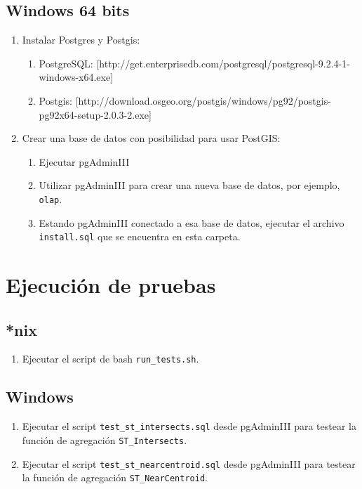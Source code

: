\documentclass[a4paper,12pt]{article}
\begin{document}
\subsection{Windows 64 bits}

\begin{enumerate}
\def\labelenumi{\arabic{enumi}.}
\item
  Instalar Postgres y Postgis:

  \begin{enumerate}
  \def\labelenumii{\arabic{enumii}.}
  \itemsep1pt\parskip0pt
  \item
    PostgreSQL:
    {[}http://get.enterprisedb.com/postgresql/postgresql-9.2.4-1-windows-x64.exe{]}
  \item
    Postgis:
    {[}http://download.osgeo.org/postgis/windows/pg92/postgis-pg92x64-setup-2.0.3-2.exe{]}
  \end{enumerate}
\item
  Crear una base de datos con posibilidad para usar PostGIS:

  \begin{enumerate}
  \def\labelenumii{\arabic{enumii}.}
  \itemsep1pt\parskip0pt
  \item
    Ejecutar pgAdminIII
  \item
    Utilizar pgAdminIII para crear una nueva base de datos, por ejemplo,
    \texttt{olap}.
  \item
    Estando pgAdminIII conectado a esa base de datos, ejecutar el
    archivo \texttt{install.sql} que se encuentra en esta carpeta.
  \end{enumerate}
\end{enumerate}

\section{Ejecución de pruebas}

\subsection{*nix}

\begin{enumerate}
\def\labelenumi{\arabic{enumi}.}
\itemsep1pt\parskip0pt
\item
  Ejecutar el script de bash \texttt{run\_tests.sh}.
\end{enumerate}

\subsection{Windows}

\begin{enumerate}
\def\labelenumi{\arabic{enumi}.}
\item
  Ejecutar el script \texttt{test\_st\_intersects.sql} desde pgAdminIII
  para testear la función de agregación \texttt{ST\_Intersects}.
\item
  Ejecutar el script \texttt{test\_st\_nearcentroid.sql} desde
  pgAdminIII para testear la función de agregación
  \texttt{ST\_NearCentroid}.
\end{enumerate}
\end{document}
